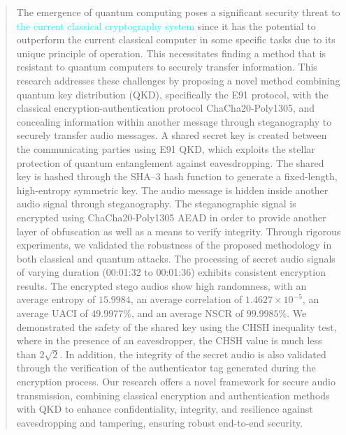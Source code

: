 \documentclass[a4paper]{cas-sc}
\begin{document}



\begin{abstract}
    The emergence of quantum computing poses a significant security threat to \textcolor{cyan}{the current classical cryptography system} since it has the potential to outperform the current classical computer in some specific tasks due to its unique principle of operation. This necessitates finding a method that is resistant to quantum computers to securely transfer information. This research addresses these challenges by proposing a novel method combining quantum key distribution (QKD), specifically the E91 protocol, with the classical encryption-authentication protocol ChaCha20-Poly1305, and concealing information within another message through steganography to securely transfer audio messages. A shared secret key is created between the communicating parties using E91 QKD, which exploits the stellar protection of quantum entanglement against eavesdropping. The shared key is hashed through the SHA--3 hash function to generate a fixed-length, high-entropy symmetric key. The audio message is hidden inside another audio signal through steganography. The steganographic signal is encrypted using ChaCha20-Poly1305 AEAD in order to provide another layer of obfuscation as well as a means to verify integrity. Through rigorous experiments, we validated the robustness of the proposed methodology in both classical and quantum attacks. The processing of secret audio signals of varying duration (00:01:32 to 00:01:36) exhibits consistent encryption results. The encrypted stego audios show high randomness, with an average entropy of $15.9984$, an average correlation of $1.4627\times 10^{-5}$, an average UACI of $ 49.9977\%$, and an average NSCR of $99.9985\%$.  We demonstrated the safety of the shared key using the CHSH inequality test, where in the presence of an eavesdropper, the CHSH value is much less than $2\sqrt{2}$. In addition, the integrity of the secret audio is also validated through the verification of the authenticator tag generated during the encryption process. Our research offers a novel framework for secure audio transmission, combining classical encryption and authentication methods with QKD to enhance confidentiality, integrity, and resilience against eavesdropping and tampering, ensuring robust end-to-end security.
\end{abstract}
\end{document}
